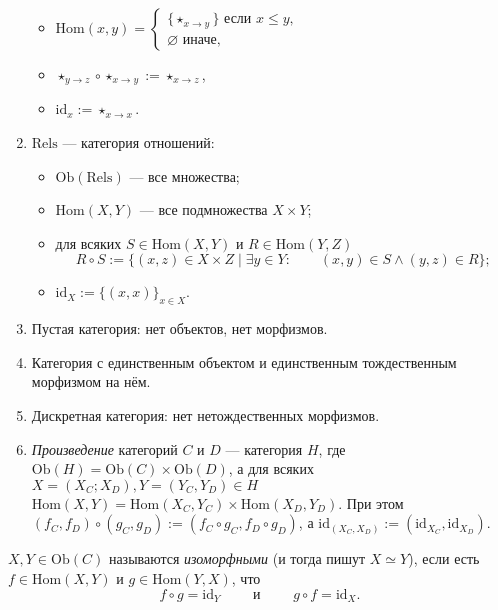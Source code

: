 \documentclass[12pt,a4paper]{article}
\newcommand{\Hom}{\mathrm{Hom}}
\newcommand{\Ob}{\mathrm{Ob}}
\newcommand{\id}{\mathrm{id}}
\newcommand{\Rels}{\mathrm{Rels}}
\begin{document}
\begin{example}
\begin{enumerate}
\begin{itemize}
                    \item
                        $\Hom(x, y) = \begin{cases}
                            \{\star_{x\to y}\} \text{ если } x \leqslant y,\\
                            \varnothing \text{ иначе},
                        \end{cases}$
                    \item $\star_{y\to z} \circ \star_{x\to y} := \star_{x\to z}$,
                    \item $\id_x := \star_{x\to x}$.
                \end{itemize}
            \item $\Rels$ --- категория отношений:
                \begin{itemize}
                    \item $\Ob(\Rels)$ --- все множества;
                    \item $\Hom(X, Y)$ --- все подмножества $X \times Y$;
                    \item для всяких $S \in \Hom(X, Y)$ и $R \in \Hom(Y, Z)$
                        \[R \circ S := \{(x, z) \in X \times Z \mid \exists y \in Y: \qquad (x, y) \in S \wedge (y, z) \in R\};\]
                    \item $\id_X := \{(x, x)\}_{x \in X}$. 
                \end{itemize}
            \item Пустая категория: нет объектов, нет морфизмов.
            \item Категория с единственным объектом и единственным тождественным морфизмом на нём.
            \item Дискретная категория: нет нетождественных морфизмов.
            \item \emph{Произведение} категорий $C$ и $D$ --- категория $H$, где $\Ob(H) = \Ob(C) \times \Ob(D)$, а для всяких $X = (X_C; X_D), Y = (Y_C, Y_D) \in H$ $\Hom(X, Y) = \Hom(X_C, Y_C) \times \Hom(X_D, Y_D)$. При этом $(f_C, f_D) \circ (g_C, g_D) := (f_C \circ g_C, f_D \circ g_D)$, а $\id_{(X_C, X_D)} := (\id_{X_C}, \id_{X_D})$.
        \end{enumerate}
    \end{example}

    \begin{definition}
        $X, Y \in \Ob(C)$ называются \emph{изоморфными} (и тогда пишут $X \simeq Y$), если есть $f \in \Hom(X, Y)$ и $g \in \Hom(Y, X)$, что
        \[f \circ g = \id_Y \qquad \text{ и } \qquad g \circ f = \id_X.\]
    \end{definition}
\end{document}
